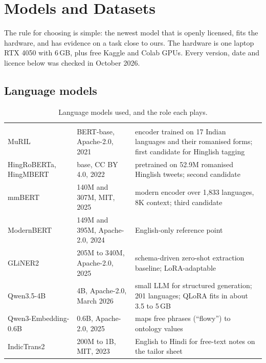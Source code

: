 \chapter{Models and Datasets}\label{ch:sota}

The rule for choosing is simple: the newest model that is openly licensed, fits the hardware, and has evidence on a task close to ours. The hardware is one laptop RTX 4050 with 6\,GB, plus free Kaggle and Colab GPUs. Every version, date and licence below was checked in October 2026.

\section{Language models}

\begin{table}[h]
\centering\small
\caption{Language models used, and the role each plays.}\label{tab:lm}
\begin{tabularx}{\textwidth}{@{}P{3.3cm}P{3.6cm}L@{}}
 &  & \\
MuRIL \cite{khanuja2021muril} & BERT-base, Apache-2.0, 2021 & encoder trained on 17 Indian languages and their romanised forms; first candidate for Hinglish tagging\\
HingRoBERTa, HingMBERT \cite{nayak2022hingbert} & base, CC BY 4.0, 2022 & pretrained on 52.9M romanised Hinglish tweets; second candidate\\
mmBERT \cite{marone2025mmbert} & 140M and 307M, MIT, 2025 & modern encoder over 1,833 languages, 8K context; third candidate\\
ModernBERT \cite{warner2025modernbert} & 149M and 395M, Apache-2.0, 2024 & English-only reference point\\
GLiNER2 \cite{zaratiana2025gliner2} & 205M to 340M, Apache-2.0, 2025 & schema-driven zero-shot extraction baseline; LoRA-adaptable\\
Qwen3.5-4B \cite{qwen35} & 4B, Apache-2.0, March 2026 & small LLM for structured generation; 201 languages; QLoRA fits in about 3.5 to 5\,GB\\
Qwen3-Embedding-0.6B & 0.6B, Apache-2.0, 2025 & maps free phrases (``flowy'') to ontology values\\
IndicTrans2 \cite{gala2023indictrans2} & 200M to 1B, MIT, 2023 & English to Hindi for free-text notes on the tailor sheet\\
\end{tabularx}
\end{table}

